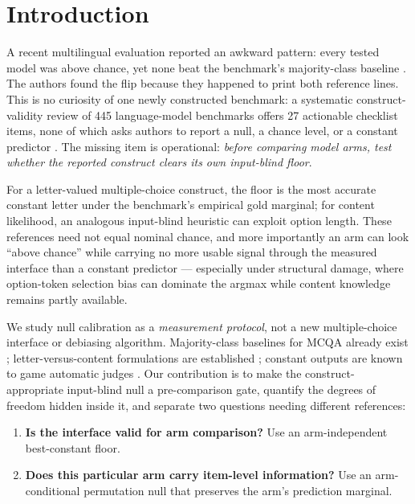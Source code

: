 \section{Introduction}

A recent multilingual evaluation reported an awkward pattern: every tested model was above chance, yet none beat the benchmark's majority-class baseline \citep{arcon2026metalinguistic}. The authors found the flip because they happened to print both reference lines. This is no curiosity of one newly constructed benchmark: a systematic construct-validity review of 445 language-model benchmarks offers 27 actionable checklist items, none of which asks authors to report a null, a chance level, or a constant predictor \citep{bean2025measuring}. The missing item is operational: \emph{before comparing model arms, test whether the reported construct clears its own input-blind floor}.

For a letter-valued multiple-choice construct, the floor is the most accurate constant letter under the benchmark's empirical gold marginal; for content likelihood, an analogous input-blind heuristic can exploit option length. These references need not equal nominal chance, and more importantly an arm can look ``above chance'' while carrying no more usable signal through the measured interface than a constant predictor --- especially under structural damage, where option-token selection bias \citep{zheng2024selectors} can dominate the argmax while content knowledge remains partly available.

We study null calibration as a \emph{measurement protocol}, not a new multiple-choice interface or debiasing algorithm. Majority-class baselines for MCQA already exist \citep{balepur2024artifacts}; letter-versus-content formulations are established \citep{gu2025olmes,cho2026choices}; constant outputs are known to game automatic judges \citep{zheng2025cheating}. Our contribution is to make the construct-appropriate input-blind null a pre-comparison gate, quantify the degrees of freedom hidden inside it, and separate two questions needing different references:

\begin{enumerate}[leftmargin=*,nosep]
    \item \textbf{Is the interface valid for arm comparison?} Use an arm-independent best-constant floor.
    \item \textbf{Does this particular arm carry item-level information?} Use an arm-conditional permutation null that preserves the arm's prediction marginal.
\end{enumerate}

